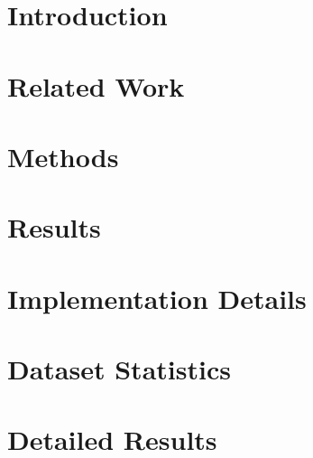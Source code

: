 \documentclass[letterpaper]{article} %
\begin{document}
\section{Introduction}


\section{Related Work}


\section{Methods}


\section{Results}






\newpage
\hfill

\newpage
\appendix
\section{Implementation Details}\label{app:training_details}


\section{Dataset Statistics}\label{app:dataset_stats}


\section{Detailed Results}\label{app:detailed_results}

\end{document}
